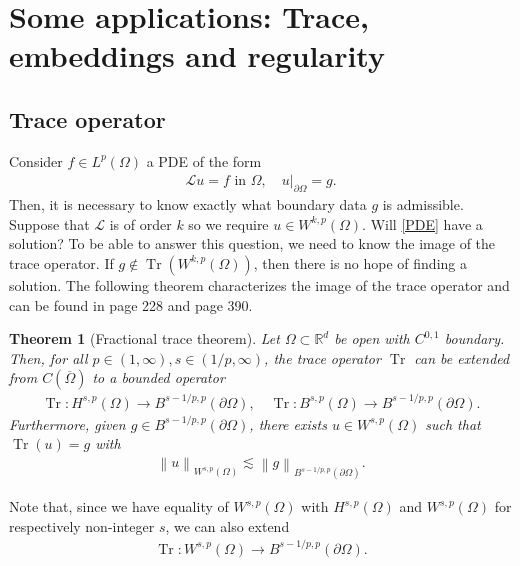 \documentclass[
    a4paper,
    DIV=14,
    abstract=true,
    numbers=noenddot
]
{scrartcl}
\newtheorem{theorem}{Theorem}[section]
\theoremstyle{definition}
\renewcommand{\norm}[1]{\left\lVert #1 \right\rVert}\renewcommand{\abs}[1]{\left| #1 \right|}
\newcommand\restr[2]{\left.#1\right|_{#2}}
\newcommand{\R}{\mathbb{R}}
\newcommand{\Ll}{\mathcal{L}}
\begin{document}
\section{Some applications: Trace, embeddings and regularity}
\subsection{Trace operator}
Consider $f \in L^p(\Omega )$  a PDE of the form
\begin{align}\label{PDE}
    \Ll u =f \text{ in } \Omega , \quad \restr{u}{\partial \Omega }= g.
\end{align}
Then, it is necessary to know exactly what boundary data $g$ is admissible. Suppose that $\Ll $ is of order $k$ so we require  $u \in W^{k,p}(\Omega )$. Will \eqref{PDE} have a solution? To be able to answer this question, we need to know the image of the trace operator. If $g \notin \operatorname{Tr}(W^{k,p}(\Omega ))$, then there is no hope of finding a solution. The following theorem characterizes the image of the trace operator and can be found in \cite{agranovich2015sobolev} page 228 and \cite{leoni2023first} page 390.
\begin{theorem}[Fractional trace theorem]\label{trace theorem}
    Let $\Omega \subset \R^d$ be open with $C^{0,1}$ boundary. Then, for all  $p\in (1,\infty), s\in (1/p,\infty) $, the trace operator $\operatorname{Tr}$ can be extended from $C(\overline{\Omega } )$  to a bounded operator
    \begin{align*}
        \operatorname{Tr}: H^{s,p}(\Omega ) \to B^{s-1/p,p}(\partial\Omega), \quad \operatorname{Tr}: B^{s,p}(\Omega ) \to B^{s-1/p,p}(\partial\Omega).
    \end{align*}
    Furthermore, given $g \in B^{s-1/p,p}(\partial\Omega)$, there exists $u \in W^{s,p}(\Omega )$ such that $\operatorname{Tr}(u)=g$ with
    \begin{align*}
        \norm{u}_{W^{s,p}(\Omega )}\lesssim \norm{g}_{B^{s-1/p,p}(\partial\Omega)}.
    \end{align*}
\end{theorem}
Note that, since we have equality of $W^{s,p}(\Omega )$ with $H^{s,p}(\Omega )$ and $W^{s,p}(\Omega )$ for respectively non-integer  $s$, we can also extend
\begin{align*}
    \operatorname{Tr}: W^{s,p}(\Omega ) \to B^{s-1/p,p}(\partial\Omega).
\end{align*}
\end{document}

